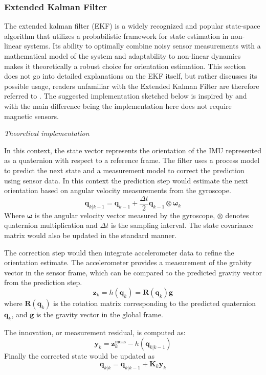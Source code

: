 \subsubsection{Extended Kalman Filter}

The extended kalman filter (EKF) is a widely recognized and popular state-space algorithm that utilizes a probabilistic framework for state estimation in non-linear systems. Its ability to optimally combine noisy sensor measurements with a mathematical model of the system and adaptability to non-linear dynamics makes it theoretically a robust choice for orientation estimation. This section does not go into detailed explanations on the EKF itself, but rather discusses its possible usage, readers unfamiliar with the Extended Kalman Filter are therefore referred to . The suggested implementation sketched below is inspired by \cite{sabatini_kalman-filter-based_2011} and \cite{noauthor_extended_nodate} with the main difference being the implementation here does not require magnetic sensors.


\textit{Theoretical implementation}

In this context, the state vector represents the orientation of the IMU represented as a quaternion with respect to a reference frame. The filter uses a process model to predict the next state and a measurement model to correct the prediction using sensor data. In this context the prediction step would estimate the next orientation based on angular velocity measurements from the gyroscope.
\[
\mathbf{q}_{k|k-1} = \mathbf{q}_{k-1} + \frac{\Delta t}{2} \mathbf{q}_{k-1} \otimes \mathbf{\omega}_k
\]
Where \( \mathbf{\omega} \) is the angular velocity vector measured by the gyroscope, \( \otimes \) denotes quaternion multiplication and \( \Delta t \) is the sampling interval. The state covariance matrix would also be updated in the standard manner.

The correction step would then integrate accelerometer data to refine the orientation estimate. The accelerometer provides a measurement of the grabity vector in the sensor frame, which can be compared to the predicted gravity vector from the prediction step.
\[
\mathbf{z}_k = h(\mathbf{q}_k) = \mathbf{R}(\mathbf{q}_k) \mathbf{g}
\]
where \( \mathbf{R}(\mathbf{q}_k) \) is the rotation matrix corresponding to the predicted quaternion \( \mathbf{q}_k \), and \( \mathbf{g} \) is the gravity vector in the global frame.

The innovation, or measurement residual, is computed as:
\[
\mathbf{y}_k = \mathbf{z}_k^{\text{meas}} - h(\mathbf{q}_{k|k-1})
\]
Finally the corrected state would be updated as 
\[
\mathbf{q}_{k|k} = \mathbf{q}_{k|k-1} + \mathbf{K}_k \mathbf{y}_k
\]

